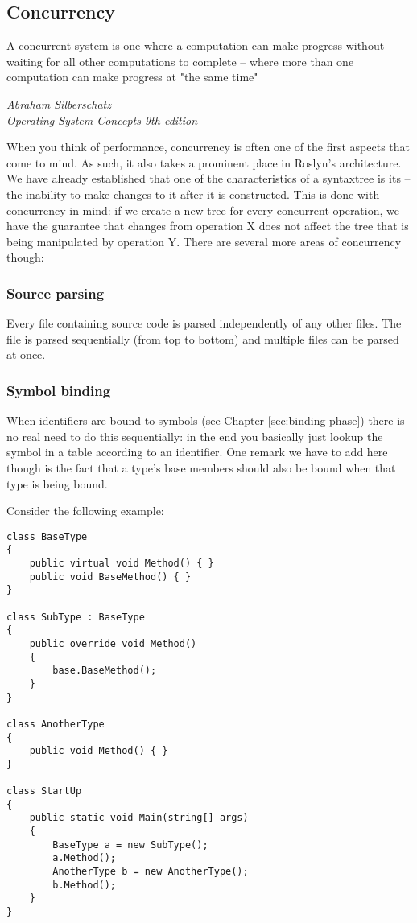 \subsection{Concurrency}
\label{sec:concurrency}

\epigraph{A concurrent system is one where a computation can make progress without waiting for all other computations to complete -- where more than one computation can make progress at "the same time"}{\textit{Abraham Silberschatz \\ \footnotesize{Operating System Concepts 9th edition}}}

When you think of performance, concurrency is often one of the first aspects that come to mind. As such, it also takes a prominent place in Roslyn's architecture. We have already established that one of the characteristics of a \gls{syntaxtree} is its  -- the inability to make changes to it after it is constructed. This is done with concurrency in mind: if we create a new tree for every concurrent operation, we have the guarantee that changes from operation X does not affect the tree that is being manipulated by operation Y. There are several more areas of concurrency though:

\subsubsection{Source parsing}
\label{sec:concur-source-parsing}

Every file containing source code is parsed independently of any other files. The file is parsed sequentially (from top to bottom) and multiple files can be parsed at once.\parencite{Sadov2014}

\subsubsection{Symbol binding }
\label{sec:concur-symbol-binding}

When identifiers are bound to symbols (see Chapter \ref{sec:binding-phase}) there is no real need to do this sequentially: in the end you basically just lookup the symbol in a table according to an identifier. One remark we have to add here though is the fact that a type's base members should also be bound when that type is being bound.

Consider the following example:

\begin{lstlisting}
class BaseType
{
	public virtual void Method() { }
	public void BaseMethod() { }	
}

class SubType : BaseType
{
	public override void Method()
	{
		base.BaseMethod();
	}
}

class AnotherType
{
	public void Method() { }
}

class StartUp 
{
	public static void Main(string[] args)
	{
		BaseType a = new SubType();
		a.Method();
		AnotherType b = new AnotherType();
		b.Method();
	}
}
\end{lstlisting}

